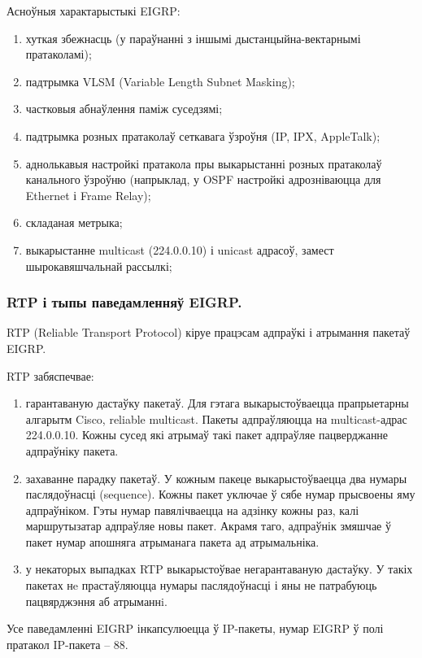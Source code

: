 Асноўныя характарыстыкі EIGRP:
\begin{enumerate}
     \item хуткая збежнасць (у параўнанні з іншымі дыстанцыйна-вектарнымі пратаколамі);
     \item падтрымка VLSM (Variable Length Subnet Masking);
     \item частковыя абнаўлення паміж суседзямі;
     \item падтрымка розных пратаколаў сеткавага ўзроўня (IP, IPX, AppleTalk);
     \item аднолькавыя настройкі пратакола пры выкарыстанні розных пратаколаў канального ўзроўню (напрыклад, у OSPF настройкі адрозніваюцца для Ethernet і Frame Relay);
     \item складаная метрыка;
     \item выкарыстанне multicast (224.0.0.10) і unicast адрасоў, замест шырокавяшчальнай рассылкі;
\end{enumerate}

\subsubsection{RTP і тыпы паведамленняў EIGRP.}

RTP (Reliable Transport Protocol) кіруе працэсам адпраўкі і атрымання пакетаў EIGRP.

RTP забяспечвае:
\begin{enumerate}
    \item гарантаваную дастаўку пакетаў. Для гэтага выкарыстоўваецца прапрыетарны алгарытм Cisco, reliable multicast. Пакеты адпраўляюцца на multicast-адрас 224.0.0.10. Кожны сусед які атрымаў такі пакет адпраўляе пацверджанне адпраўніку пакета.
    \item захаванне парадку пакетаў. У кожным пакеце выкарыстоўваецца два нумары паслядоўнасці (sequence). Кожны пакет уключае ў сябе нумар прысвоены яму адпраўніком. Гэты нумар павялічваецца на адзінку кожны раз, калі маршрутызатар адпраўляе новы пакет. Акрамя таго, адпраўнік змяшчае ў пакет нумар апошняга атрыманага пакета ад атрымальніка.
    \item у некаторых выпадках RTP выкарыстоўвае негарантаваную дастаўку. У такіх пакетах нe прастаўляюцца нумары паслядоўнасці і яны не патрабуюць пацвярджэння аб атрыманнi.
\end{enumerate}

Усе паведамленні EIGRP інкапсулюецца ў IP-пакеты, нумар EIGRP ў полі пратакол IP-пакета -- 88.

